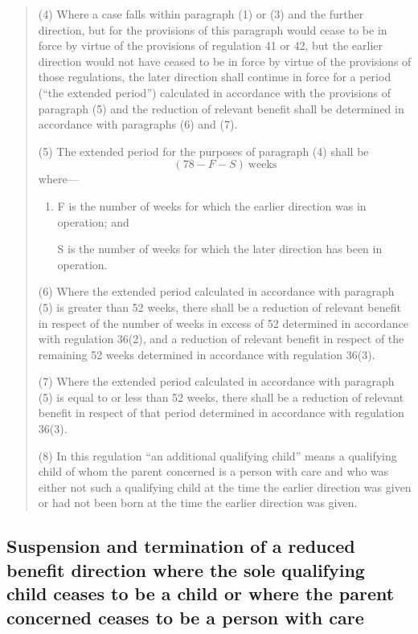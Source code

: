 \documentclass[a4paper]{article}
\begin{document}
{\begin{quotation}
(4) Where a case falls within paragraph (1) or (3) and the further direction, but for the provisions of this paragraph would cease to be in force by virtue of the provisions of regulation 41 or 42, but the earlier direction would not have ceased to be in force by virtue of the provisions of those regulations, the later direction shall continue in force for a period (“the extended period”) calculated in accordance with the provisions of paragraph (5) and the reduction of relevant benefit 
shall be determined in accordance with paragraphs (6) and (7).

(5) The extended period for the purposes of paragraph (4) shall be 
\[(78 - F - S) \ \mathrm{weeks}\]
 where—
\begin{enumerate}\item[]
F is the number of weeks for which the earlier direction was in operation; and

S is the number of weeks for which the later direction has been in operation.
\end{enumerate}

(6) Where the extended period calculated in accordance with paragraph (5) is greater than 52 weeks, there shall be a reduction of relevant benefit in respect of the number of weeks in excess of 52 determined in accordance with regulation 36(2), and a reduction of relevant benefit in respect of the remaining 52 weeks determined in accordance with regulation 36(3).

(7) Where the extended period calculated in accordance with paragraph (5) is equal to or less than 52 weeks, there shall be a reduction of relevant benefit in respect of that period determined in accordance with regulation 36(3).

(8) In this regulation “an additional qualifying child” means a qualifying child of whom the parent concerned is a person with care and who was either not such a qualifying child at the time the earlier direction was given or had not been born at the time the earlier direction was given.
\end{quotation}
}

\subsection[48. Suspension and termination of a reduced benefit direction where the sole qualifying child ceases to be a child or where the parent concerned ceases to be a person with care]{\sloppy Suspension and termination of a reduced benefit direction where the sole qualifying child ceases to be a child or where the parent concerned ceases to be a person with care}
\end{document}

